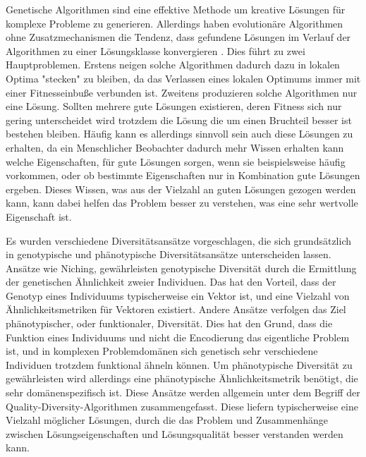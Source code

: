 \documentclass[12pt]{article}
\begin{document}
Genetische Algorithmen sind eine effektive  Methode um kreative Lösungen für komplexe Probleme zu generieren.
Allerdings haben evolutionäre Algorithmen ohne Zusatzmechanismen die Tendenz, dass gefundene Lösungen im Verlauf der Algorithmen zu einer Lösungsklasse konvergieren \cite{Shir.2012}.
Dies führt zu zwei Hauptproblemen. 
Erstens neigen solche Algorithmen dadurch dazu in lokalen Optima "stecken" zu bleiben, da das Verlassen eines lokalen Optimums immer mit einer Fitnesseinbuße verbunden ist.
Zweitens produzieren solche Algorithmen nur eine Lösung. 
Sollten mehrere gute Lösungen existieren, deren Fitness sich nur gering unterscheidet wird trotzdem die Lösung die um einen Bruchteil besser ist bestehen bleiben.
Häufig kann es allerdings sinnvoll sein auch diese Lösungen zu erhalten, da ein Menschlicher Beobachter dadurch mehr Wissen erhalten kann welche Eigenschaften, für gute Lösungen sorgen, wenn sie beispielsweise häufig vorkommen, oder ob bestimmte Eigenschaften nur in Kombination gute Lösungen ergeben.
Dieses Wissen, was aus der Vielzahl an guten Lösungen gezogen werden kann, kann dabei helfen das Problem besser zu verstehen, was eine sehr wertvolle Eigenschaft ist.

Es wurden verschiedene Diversitätsansätze vorgeschlagen, die sich grundsätzlich in genotypische und phänotypische Diversitätsansätze unterscheiden lassen.
Ansätze wie Niching, gewährleisten genotypische Diversität durch die Ermittlung der genetischen Ähnlichkeit zweier Individuen.
Das hat den Vorteil, dass der Genotyp eines Individuums typischerweise ein Vektor ist, und eine Vielzahl von Ähnlichkeitsmetriken für Vektoren existiert.
Andere Ansätze verfolgen das Ziel phänotypischer, oder funktionaler, Diversität.
Dies hat den Grund, dass die Funktion eines Individuums und nicht die Encodierung das eigentliche Problem ist, und in komplexen Problemdomänen sich genetisch sehr verschiedene Individuen trotzdem funktional ähneln können.
Um phänotypische Diversität zu gewährleisten wird allerdings eine phänotypische Ähnlichkeitsmetrik benötigt, die sehr domänenspezifisch ist.
Diese Ansätze werden allgemein unter dem Begriff der Quality-Diversity-Algorithmen zusammengefasst.
Diese liefern typischerweise eine Vielzahl möglicher Lösungen, durch die das Problem und Zusammenhänge zwischen Lösungseigenschaften und Lösungsqualität besser verstanden werden kann.
\end{document}
